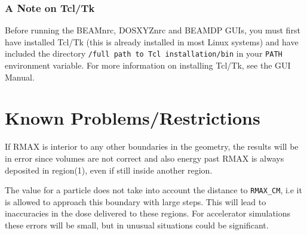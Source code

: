 \documentclass[12pt,twoside]{article}
\begin{document}
%
%

\subsubsection{A Note on Tcl/Tk}
Before running the BEAMnrc, DOSXYZnrc and BEAMDP GUIs, you must first
have installed Tcl/Tk (this is already installed in most Linux systems) and
have included the directory {\tt /full path to Tcl installation/bin} in
your {\tt PATH} environment variable.  For more information on installing
Tcl/Tk, see the GUI Manual\cite{Tr04}.

\section{Known Problems/Restrictions}
\label{knownbugs}

If RMAX is interior to any other boundaries in the geometry, the
results will be in error since volumes are not correct and also energy past
RMAX is always deposited in region(1), even if still inside another
region.

The value for a particle does not take into account the distance
to {\tt RMAX\_CM}, i.e it is allowed to approach this boundary with
large steps.  This will lead to inaccuracies in the dose delivered to
these regions. For accelerator simulations these errors will be small,
but in unusual situations could be significant.
\end{document}
